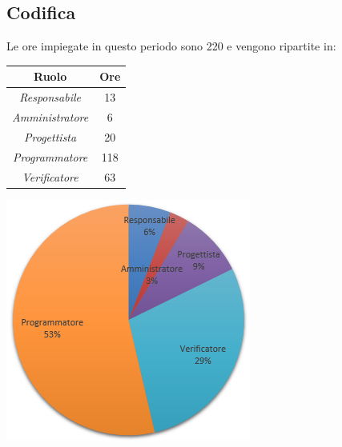 \subsection{Codifica}
Le ore impiegate in questo periodo sono 220 e vengono ripartite in:
\begin{center}
  \centering
  \begin{tabular}{|c|c|}
    \hline
    \textbf{Ruolo} & \textbf{Ore} \\
    \hline
     \emph{Responsabile}  & 13 \\
    \hline  \emph{Amministratore}  & 6 \\
    \hline  \emph{Progettista}  & 20 \\
    \hline  \emph{Programmatore}  & 118 \\
    \hline  \emph{Verificatore}  & 63 \\
    \hline
  \end{tabular}
  \includegraphics[scale=0.7]{img/grafico5.png}
\end{center}


